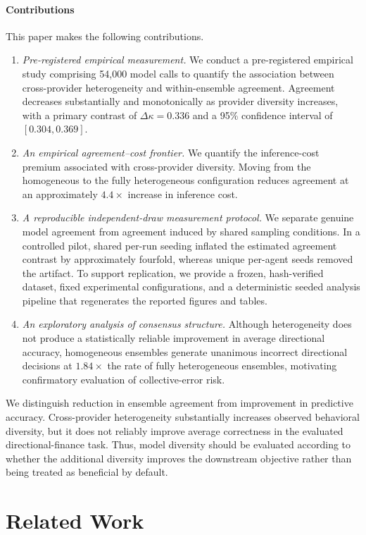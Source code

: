 \documentclass{ieeeaccess}
\begin{document}
\paragraph{Contributions}
This paper makes the following contributions.
\begin{enumerate}
\item \emph{Pre-registered empirical measurement.} We conduct a pre-registered
empirical study comprising 54{,}000 model calls to quantify the association
between cross-provider heterogeneity and within-ensemble agreement. Agreement decreases
substantially and monotonically as provider diversity increases, with a primary
contrast of $\Delta\kappa=0.336$ and a 95\% confidence interval of
$[0.304, 0.369]$.
\item \emph{An empirical agreement--cost frontier.} We quantify the
inference-cost premium associated with cross-provider diversity. Moving from the
homogeneous to the fully heterogeneous configuration reduces agreement at an
approximately $4.4\times$ increase in inference cost.
\item \emph{A reproducible independent-draw measurement protocol.} We separate
genuine model agreement from agreement induced by shared sampling conditions. In
a controlled pilot, shared per-run seeding inflated the estimated agreement
contrast by approximately fourfold, whereas unique per-agent seeds removed the
artifact. To support replication, we provide a frozen, hash-verified dataset,
fixed experimental configurations, and a deterministic seeded analysis pipeline
that regenerates the reported figures and tables.
\item \emph{An exploratory analysis of consensus structure.} Although
heterogeneity does not produce a statistically reliable improvement in average
directional accuracy, homogeneous ensembles generate unanimous incorrect
directional decisions at $1.84\times$ the rate of fully heterogeneous ensembles,
motivating confirmatory evaluation of collective-error risk.
\end{enumerate}
We distinguish reduction in ensemble agreement from improvement in predictive
accuracy. Cross-provider heterogeneity substantially increases observed
behavioral diversity, but it does not reliably improve average correctness in
the evaluated directional-finance task. Thus, model diversity should be
evaluated according to whether the additional diversity improves the downstream
objective rather than being treated as beneficial by default.

\section{Related Work}
\end{document}
